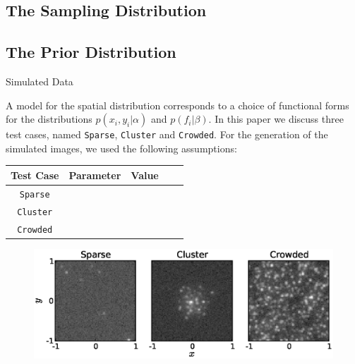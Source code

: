 \documentclass[letterpaper, 11pt]{article}
\newcommand{\sparse}{\texttt{Sparse}}
\newcommand{\cluster}{\texttt{Cluster}}
\newcommand{\crowded}{\texttt{Crowded}}
\begin{document}
\subsection{The Sampling Distribution}


\subsection{The Prior Distribution}

{Simulated Data}


A model for the spatial distribution corresponds to a choice of functional
forms for the distributions $p(x_i, y_i | \alpha)$ and $p(f_i | \beta)$.
In this paper we discuss three test cases, named \sparse, \cluster
and \crowded. For the generation of the simulated
images, we used the following assumptions:

\begin{table}
\begin{center}
\begin{tabular}{ccccc}
Test Case & Parameter & Value \\
\hline
\sparse \\
\cluster \\
\crowded
\end{tabular}
\end{center}
\end{table}

\begin{figure}
\hspace{-1cm}
\includegraphics{Figures/test_cases.eps}
\end{figure}
\end{document}
